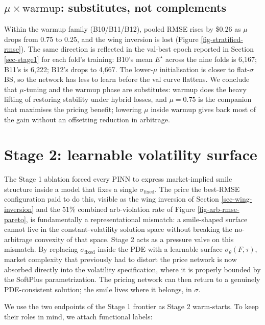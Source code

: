 \documentclass[
  11pt,
]{article}
\begin{document}
\subsection{\texorpdfstring{\(\mu \times \mathrm{warmup}\): substitutes,
not
complements}{\textbackslash mu \textbackslash times \textbackslash mathrm\{warmup\}: substitutes, not complements}}\label{sec-mu-warmup}

Within the warmup family (B10/B11/B12), pooled RMSE rises by \$0.26 as
\(\mu\) drops from 0.75 to 0.25, and the wing inversion is lost (Figure
\ref{fig-stratified-rmse}). The same direction is reflected in the
val-best epoch reported in Section \ref{sec-stage1} for each fold's
training: B10's mean \(E^\star\) across the nine folds is 6,167; B11's
is 6,222; B12's drops to 4,667. The lower-\(\mu\) initialisation is
closer to flat-\(\sigma\) BS, so the network has less to learn before
the val curve flattens. We conclude that \(\mu\)-tuning and the warmup
phase are substitutes: warmup does the heavy lifting of restoring
stability under hybrid losses, and \(\mu = 0.75\) is the companion that
maximises the pricing benefit; lowering \(\mu\) inside warmup gives back
most of the gain without an offsetting reduction in arbitrage.

\section{Stage 2: learnable volatility surface}\label{sec-stage2}

The Stage 1 ablation forced every PINN to express market-implied smile
structure inside a model that fixes a single \(\sigma_\mathrm{fixed}\).
The price the best-RMSE configuration paid to do this, visible as the
wing inversion of Section \ref{sec-wing-inversion} and the 51\% combined
arb-violation rate of Figure \ref{fig-arb-rmse-pareto}, is fundamentally
a representational mismatch: a smile-shaped surface cannot live in the
constant-volatility solution space without breaking the no-arbitrage
convexity of that space. Stage 2 acts as a pressure valve on this
mismatch. By replacing \(\sigma_\mathrm{fixed}\) inside the PDE with a
learnable surface \(\sigma_\theta(F,\tau)\), market complexity that
previously had to distort the price network is now absorbed directly
into the volatility specification, where it is properly bounded by the
SoftPlus parametrization. The pricing network can then return to a
genuinely PDE-consistent solution; the smile lives where it belongs, in
\(\sigma\).

We use the two endpoints of the Stage 1 frontier as Stage 2 warm-starts.
To keep their roles in mind, we attach functional labels:
\end{document}
